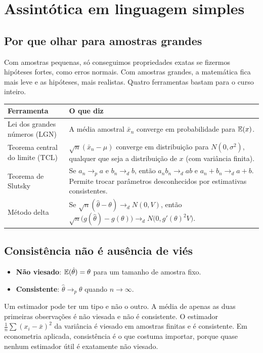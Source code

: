 \chapter{Assintótica em linguagem simples}
\label{cap:assint}

\section{Por que olhar para amostras grandes}
Com amostras pequenas, só conseguimos propriedades exatas se fizermos hipóteses fortes, como erros normais. Com amostras grandes, a matemática fica mais leve e as hipóteses, mais realistas. Quatro ferramentas bastam para o curso inteiro.

\begin{center}
\small
\begin{tabular}{p{3.6cm}p{10.2cm}}
\toprule
\textbf{Ferramenta} & \textbf{O que diz} \\
\midrule
Lei dos grandes números (LGN) & A média amostral $\bar x_n$ converge em probabilidade para $\mathbb{E}(x)$. \\
Teorema central do limite (TCL) & $\sqrt n(\bar x_n-\mu)$ converge em distribuição para $N(0,\sigma^2)$, qualquer que seja a distribuição de $x$ (com variância finita). \\
Teorema de Slutsky & Se $a_n\to_p a$ e $b_n\to_d b$, então $a_nb_n\to_d ab$ e $a_n+b_n\to_d a+b$. Permite trocar parâmetros desconhecidos por estimativas consistentes. \\
Método delta & Se $\sqrt n(\hat\theta-\theta)\to_d N(0,V)$, então $\sqrt n\big(g(\hat\theta)-g(\theta)\big)\to_d N\big(0,g'(\theta)^2V\big)$. \\
\bottomrule
\end{tabular}
\end{center}

\section{Consistência não é ausência de viés}
\begin{itemize}[leftmargin=1.4em]
\item \textbf{Não viesado}: $\mathbb{E}(\hat\theta)=\theta$ para um tamanho de amostra fixo.
\item \textbf{Consistente}: $\hat\theta\to_p\theta$ quando $n\to\infty$.
\end{itemize}
Um estimador pode ter um tipo e não o outro. A média de apenas as duas primeiras observações é não viesada e não é consistente. O estimador $\frac1n\sum(x_i-\bar x)^2$ da variância é viesado em amostras finitas e é consistente. Em econometria aplicada, consistência é o que costuma importar, porque quase nenhum estimador útil é exatamente não viesado.

